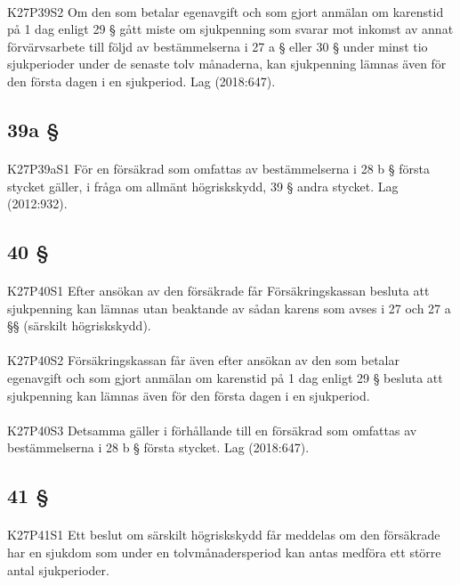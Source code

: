 \documentclass[a4paper,notitlepage,openany,10pt]{book}
\begin{document}
\paragraph*{}
{\tiny K27P39S2}
Om den som betalar egenavgift och som gjort anmälan om karenstid på 1 dag enligt 29 § gått miste om sjukpenning som svarar mot inkomst av annat förvärvsarbete till följd av bestämmelserna i 27 a § eller 30 § under minst tio sjukperioder under de senaste tolv månaderna, kan sjukpenning lämnas även för den första dagen i en sjukperiod.
Lag (2018:647).
\subsection*{39a §}
\paragraph*{}
{\tiny K27P39aS1}
För en försäkrad som omfattas av bestämmelserna i 28 b § första stycket gäller, i fråga om allmänt högriskskydd, 39 § andra stycket.
Lag (2012:932).
\subsection*{40 §}
\paragraph*{}
{\tiny K27P40S1}
Efter ansökan av den försäkrade får Försäkringskassan besluta att sjukpenning kan lämnas utan beaktande av sådan karens som avses i 27 och 27 a §§ (särskilt högriskskydd).
\paragraph*{}
{\tiny K27P40S2}
Försäkringskassan får även efter ansökan av den som betalar egenavgift och som gjort anmälan om karenstid på 1 dag enligt 29 § besluta att sjukpenning kan lämnas även för den första dagen i en sjukperiod.
\paragraph*{}
{\tiny K27P40S3}
Detsamma gäller i förhållande till en försäkrad som omfattas av bestämmelserna i 28 b § första stycket.
Lag (2018:647).
\subsection*{41 §}
\paragraph*{}
{\tiny K27P41S1}
Ett beslut om särskilt högriskskydd får meddelas om den försäkrade har en sjukdom som under en tolvmånadersperiod kan antas medföra ett större antal sjukperioder.
\end{document}
